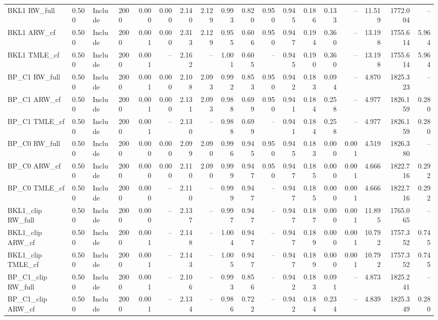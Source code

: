 \begin{tabular}{llllrrrrrrrrrrrrrr}
BKL1 RW\_full & 0.500 & Include & 2000 & 0.000 & 0.000 & 2.140 & 2.129 & 0.993 & 0.820 & 0.950 & 0.945 & 0.186 & 0.133 & -- & 11.519 & 1772.004 & -- \\
BKL1 ARW\_cf & 0.500 & Include & 2000 & 0.001 & 0.000 & 2.313 & 2.129 & 0.955 & 0.606 & 0.950 & 0.947 & 0.194 & 0.360 & -- & 13.198 & 1755.614 & 5.964 \\
BKL1 TMLE\_cf & 0.500 & Include & 2000 & 0.001 & -- & 2.162 & -- & 1.001 & 0.605 & -- & 0.945 & 0.190 & 0.360 & -- & 13.198 & 1755.614 & 5.964 \\
BP\_C1 RW\_full & 0.500 & Include & 2000 & 0.001 & 0.000 & 2.108 & 2.093 & 0.992 & 0.853 & 0.950 & 0.942 & 0.183 & 0.094 & -- & 4.870 & 1825.323 & -- \\
BP\_C1 ARW\_cf & 0.500 & Include & 2000 & 0.001 & 0.000 & 2.131 & 2.093 & 0.988 & 0.699 & 0.950 & 0.941 & 0.184 & 0.258 & -- & 4.977 & 1826.159 & 0.280 \\
BP\_C1 TMLE\_cf & 0.500 & Include & 2000 & 0.001 & -- & 2.130 & -- & 0.988 & 0.699 & -- & 0.941 & 0.184 & 0.258 & -- & 4.977 & 1826.159 & 0.280 \\
BP\_C0 RW\_full & 0.500 & Include & 2000 & 0.000 & 0.000 & 2.099 & 2.090 & 0.996 & 0.945 & 0.950 & 0.945 & 0.183 & 0.000 & 0.001 & 4.519 & 1826.380 & -- \\
BP\_C0 ARW\_cf & 0.500 & Include & 2000 & 0.000 & 0.000 & 2.110 & 2.090 & 0.999 & 0.947 & 0.950 & 0.947 & 0.185 & 0.000 & 0.001 & 4.666 & 1822.716 & 0.292 \\
BP\_C0 TMLE\_cf & 0.500 & Include & 2000 & 0.000 & -- & 2.110 & -- & 0.999 & 0.947 & -- & 0.947 & 0.185 & 0.000 & 0.001 & 4.666 & 1822.716 & 0.292 \\
BKL1\_clip RW\_full & 0.500 & Include & 2000 & 0.000 & -- & 2.137 & -- & 0.997 & 0.947 & -- & 0.947 & 0.187 & 0.000 & 0.001 & 11.895 & 1765.065 & -- \\
BKL1\_clip ARW\_cf & 0.500 & Include & 2000 & 0.001 & -- & 2.148 & -- & 1.004 & 0.947 & -- & 0.947 & 0.189 & 0.000 & 0.001 & 10.792 & 1757.352 & 0.745 \\
BKL1\_clip TMLE\_cf & 0.500 & Include & 2000 & 0.001 & -- & 2.143 & -- & 1.005 & 0.947 & -- & 0.947 & 0.189 & 0.000 & 0.001 & 10.792 & 1757.352 & 0.745 \\
BP\_C1\_clip RW\_full & 0.500 & Include & 2000 & 0.001 & -- & 2.106 & -- & 0.993 & 0.856 & -- & 0.942 & 0.183 & 0.091 & -- & 4.873 & 1825.241 & -- \\
BP\_C1\_clip ARW\_cf & 0.500 & Include & 2000 & 0.001 & -- & 2.134 & -- & 0.986 & 0.722 & -- & 0.942 & 0.184 & 0.234 & -- & 4.839 & 1825.349 & 0.280 \\

\end{tabular}
